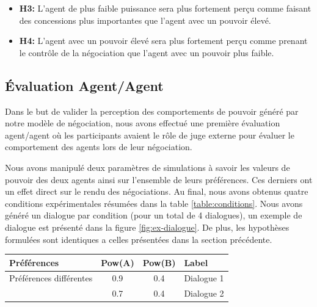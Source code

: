 \documentclass [french]{sig-alternate-05-2015}
\begin{document}
{\begin{itemize}
				\item \textbf {H3:} L'agent de plus faible puissance sera plus fortement perçu comme faisant des concessions plus importantes que l'agent  avec un pouvoir élevé.
				
				\item \textbf {H4:} L'agent  avec un pouvoir élevé sera plus fortement perçu comme prenant le contrôle de la négociation que l'agent avec un pouvoir plus faible.
			
			\end{itemize}


			\subsection{Évaluation Agent/Agent}
				Dans le but de valider la perception des comportements de pouvoir généré par notre modèle de négociation, nous avons effectué une première évaluation agent/agent où les participants avaient le rôle de juge externe pour évaluer le comportement des agents lors de leur négociation.
				
				Nous avons manipulé deux paramètres de simulations à savoir les valeurs de pouvoir des deux agents ainsi sur l'ensemble de leurs préférences. Ces derniers ont un effet direct sur le rendu des négociations. Au final, nous avons obtenus quatre conditions expérimentales résumées dans la table \ref{table:conditions}. Nous avons généré un dialogue par condition (pour un total de 4 dialogues), un exemple de dialogue est présenté dans la figure \ref{fig:ex-dialogue}. De plus, les hypothèses formulées sont identiques a celles présentées dans la section précédente. 
						\begin{table}[h]
							\centering
							\begin{tabular}{ |l|c|c|l| }
								\hline
								\textbf{Préférences}& \textbf{Pow(A)} & \textbf{Pow(B)} & \textbf{Label} \\ 
								\hline
								\newline\multirow{3}{*} { Préférences différentes} & 0.9 & 0.4 & Dialogue 1 \\ \cline{2-4}
								
								\newline  & 0.7 & 0.4 & Dialogue 2\\ \cline{2-4}
								

\end{tabular}
\end{table}}
\end{document}
